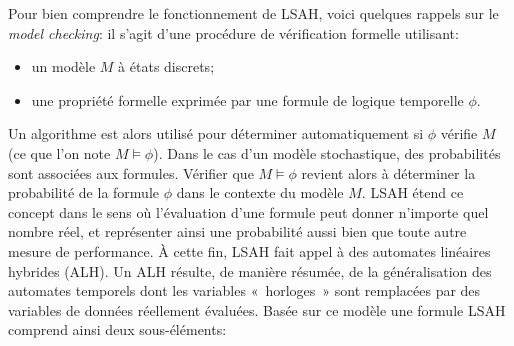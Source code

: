 Pour bien comprendre le fonctionnement de LSAH, voici quelques rappels sur le \textit{model checking}: il s'agit d'une procédure de vérification formelle utilisant:
\begin{itemize}
    \item un modèle $M$ à états discrets;
    \item une propriété formelle exprimée par une formule de logique temporelle $\phi$.
\end{itemize}
Un algorithme est alors utilisé pour déterminer automatiquement si $\phi$ vérifie $M$ (ce que l'on note $M\models\phi$).
Dans le cas d'un modèle stochastique, des probabilités sont associées aux formules.
Vérifier que $M\models\phi$ revient alors à déterminer la probabilité de la formule $\phi$ dans le contexte du modèle $M$.
LSAH étend ce concept dans le sens où l'évaluation d'une formule peut donner n'importe quel nombre réel, et représenter ainsi une probabilité aussi bien que toute autre mesure de performance.
À cette fin, LSAH fait appel à des automates linéaires hybrides (ALH).
Un ALH résulte, de manière résumée, de la généralisation des automates temporels dont les variables «~horloges~» sont remplacées par des variables de données réellement évaluées.
Basée sur ce modèle une formule LSAH comprend ainsi deux sous-éléments:
